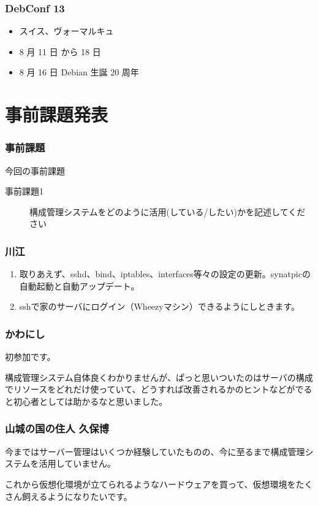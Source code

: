 \documentclass[cjk,dvipdfmx,10pt,compress,%
hyperref={bookmarks=true,bookmarksnumbered=true,bookmarksopen=false,%
colorlinks=false,%
pdftitle={第 75 回 関西 Debian 勉強会},%
pdfauthor={倉敷・のがた・佐々木・かわだ・八津尾},%
pdfsubject={資料},%
}]{beamer}
\begin{document}
\begin{frame}[fragile]
  \frametitle{DebConf 13}
  \begin{itemize}
  \item スイス、ヴォーマルキュ
  \item 8 月 11 日 から 18 日
  \item 8 月 16 日 Debian 生誕 20 周年
  \end{itemize}
\end{frame}


\section{事前課題発表}


\begin{frame}[fragile]
  \frametitle{事前課題}
  \begin{block}{今回の事前課題}
    \begin{description}
    \item[事前課題1]
      構成管理システムをどのように活用(している/したい)かを記述してください
    \end{description}
  \end{block}
\end{frame}


\begin{frame}
  \frametitle{ 川江 }
  \begin{enumerate}
  \item 取りあえず、sshd、bind、iptables、interfaces等々の設定の更新。synatpicの自動起動と自動アップデート。
  \item sshで家のサーバにログイン（Wheezyマシン）できるようにしときます。
  \end{enumerate}
\end{frame}

\begin{frame}
  \frametitle{ かわにし }
  初参加です。

  構成管理システム自体良くわかりませんが、ぱっと思いついたのはサーバの構成でリソースをどれだけ使っていて、どうすれば改善されるかのヒントなどがでると初心者としては助かるなと思いました。
\end{frame}

\begin{frame}
  \frametitle{ 山城の国の住人 久保博 }
  今まではサーバー管理はいくつか経験していたものの、今に至るまで構成管理システムを活用していません。

  これから仮想化環境が立てられるようなハードウェアを買って、仮想環境をたくさん飼えるようになりたいです。
\end{frame}
\end{document}
